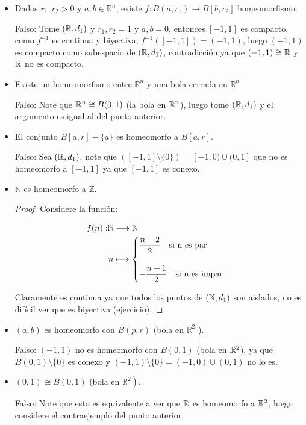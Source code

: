 \begin{itemize}[label={✎},leftmargin=*]
    \item Dados $r_1, r_2>0$ y $a, b \in \mathbb{R}^n$, existe $f: B\left(a, r_1\right) \rightarrow B\left[b, r_2\right]$ homeomorfismo.

Falso: Tome $(\mathbb{R},d_1)$ y $r_1,r_2=1$ y $a,b=0$, entonces $[-1,1]$ es compacto, como $f^{-1}$ es continua y biyectiva, $f^{-1}([-1,1])=(-1,1)$, luego $(-1,1)$ es compacto como subespacio de $(\mathbb{R},d_1)$, contradicción ya que $(-1,1)\cong \mathbb{R}$ y $\mathbb{R}$ no es compacto. 

\item Existe un homeomorfismo entre $\mathbb{R}^n$ y una bola cerrada en $\mathbb{R}^n$

Falso: Note que $\mathbb{R}^n\cong B(0,1)$ (la bola en $\mathbb{R}^n$), luego tome $(\mathbb{R},d_1)$ y el argumento es igual al del punto anterior. 

\item El conjunto $B[a, r]-\{a\}$ es homeomorfo a $B[a, r]$.

Falso: Sea $(\mathbb{R},d_1)$, note que $([-1,1]\setminus \{0\})=[-1,0)\cup(0,1]$ que no es homeomorfo a $[-1,1]$ ya que $[-1,1]$ es conexo.

\item $\mathbb{N}$ es homeomorfo a $\mathbb{Z}$.\\

\begin{proof}
Considere la función:

\begin{align*}
    f(n): &\N \longrightarrow \N\\
    &\hspace{0.03cm}n \longmapsto \begin{cases}
\dfrac{n-2}{2} \quad \text{si } $n$ \text{ es par}\\\\
-\dfrac{n+1}{2} \quad \text{si } $n$ \text{ es impar}
\end{cases}
\end{align*}

Claramente es continua ya que todos los puntos de $(\mathbb{N},d_1)$ son aislados, no es difícil ver que es biyectiva (ejercicio).

\end{proof}

\item  $(a, b)$ es homeomorfo con $B(p, r)$ (bola en $\mathbb{R}^2$ ).

Falso: $(-1,1)$ no es homeomorfo con $B(0,1)$ (bola en $\mathbb{R}^2$), ya que $B(0,1)\setminus\{0\}$ es conexo y $(-1,1)\setminus\{0\}=(-1,0)\cup(0,1)$ no lo es.


\item   $(0,1) \cong B(0,1)$ (bola en $\left.\mathbb{R}^2\right)$.

Falso: Note que esto es equivalente a ver que $\mathbb{R}$ es homeomorfo a $\mathbb{R}^2$, luego considere el contraejemplo del punto anterior.
\end{itemize}